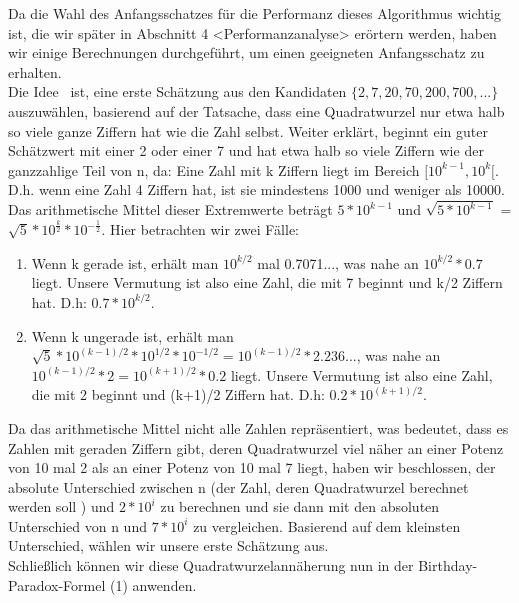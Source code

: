 \documentclass[course=erap]{aspdoc}
\begin{document}
Da die Wahl des Anfangsschatzes für die Performanz dieses Algorithmus wichtig ist, die wir später in Abschnitt 4 <Performanzanalyse> erörtern werden,
haben wir einige Berechnungen durchgeführt, um einen geeigneten Anfangsschatz zu erhalten. \\
Die Idee~\cite{initialguess} ist, eine erste Schätzung aus den Kandidaten $\{2, 7, 20, 70, 200, 700, ...\}$ auszuwählen, basierend auf der Tatsache, dass eine Quadratwurzel nur etwa halb so viele ganze Ziffern hat wie die Zahl selbst. Weiter erklärt, beginnt ein guter Schätzwert mit einer 2 oder einer 7 und hat etwa halb so viele Ziffern wie der ganzzahlige Teil von n, da: Eine Zahl mit k Ziffern liegt im Bereich $[10^{k-1}, 10^{k}[$. D.h. wenn eine Zahl 4 Ziffern hat, ist sie mindestens 1000 und weniger als 10000. Das arithmetische Mittel dieser Extremwerte beträgt $5*10^{k-1}$ und $\sqrt{5*10^{k-1}}$ = $\sqrt{5} * 10^{\frac{k}{2}} * 10^{-\frac{1}{2}}$. Hier betrachten wir zwei Fälle: \\
\begin{enumerate}
    \item  Wenn k gerade ist, erhält man $10^{k/2}$ mal 0.7071..., was nahe an $10^{k/2}*0.7$ liegt. Unsere Vermutung ist also eine Zahl, die mit 7 beginnt und k/2 Ziffern hat. D.h: $0.7*10^{k/2}$. \\
    \item  Wenn k ungerade ist, erhält man $\sqrt{5} * 10^{(k-1)/2}*10^{1/2}*10^{-1/2} = 10^{(k-1)/2}*2.236...$, was nahe an
          $10^{(k-1)/2}*2 = 10^{(k+1)/2}*0.2$ liegt. Unsere Vermutung ist also eine Zahl, die mit 2 beginnt und (k+1)/2 Ziffern hat. D.h: $0.2*10^{(k+1)/2}$. \\
\end{enumerate}
Da das arithmetische Mittel nicht alle Zahlen repräsentiert, was bedeutet, dass es Zahlen mit geraden Ziffern gibt, deren Quadratwurzel viel näher an einer Potenz von 10 mal 2 als an einer Potenz von 10 mal 7 liegt, haben wir beschlossen, der absolute Unterschied zwischen n (der Zahl, deren Quadratwurzel
berechnet werden soll ) und $2*10^{i}$ zu berechnen und sie dann mit den absoluten Unterschied von n und
$7*10^{i}$ zu vergleichen. Basierend auf dem kleinsten Unterschied, wählen wir unsere erste Schätzung aus.\\
Schließlich können wir diese Quadratwurzelannäherung nun in der Birthday-Paradox-Formel (1) anwenden.
\end{document}
